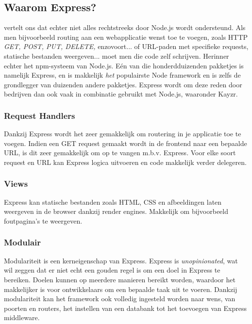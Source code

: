 \subsection{Waarom Express?}
\label{sec:whyExpress}

\textcite{ExpressMozilla} vertelt ons dat echter niet alles rechtstreeks door Node.js wordt ondersteund. Als men bijvoorbeeld routing aan een webapplicatie wenst toe te voegen, zoals HTTP \textsl{GET, POST, PUT, DELETE,} enzovoort... of URL-paden met specifieke requests, statische bestanden weergeven... moet men die code zelf schrijven. Herinner echter het npm-systeem van Node.js. Eén van die honderdduizenden pakketjes is namelijk Express, en is makkelijk \textit{het} populairste Node framework en is zelfs de grondlegger van duizenden andere pakketjes. Express wordt om deze reden door bedrijven dan ook vaak in combinatie gebruikt met Node.js, waaronder Kayzr. 

\subsubsection{Request Handlers}
\label{sec:reqHandlers}

Dankzij Express wordt het zeer gemakkelijk om routering in je applicatie toe te voegen. Indien een GET request gemaakt wordt in de frontend naar een bepaalde URL, is dit zeer gemakkelijk om op te vangen m.b.v. Express. Voor elke soort request en URL kan Express logica uitvoeren en code makkelijk verder delegeren.

\subsubsection{Views}
\label{sec:expressViews}

Express kan statische bestanden zoals HTML, CSS en afbeeldingen laten weergeven in de browser dankzij render engines. Makkelijk om bijvoorbeeld foutpagina's te weergeven.

\subsubsection{Modulair}
\label{sec:expressModularity}

Modulariteit is een kerneigenschap van Express. Express is \textit{unopinionated}, wat wil zeggen dat er niet echt een gouden regel is om een doel in Express te bereiken. Doelen kunnen op meerdere manieren bereikt worden, waardoor het makkelijker is voor ontwikkelaars om een bepaalde taak uit te voeren. Dankzij modulariteit kan het framework ook volledig ingesteld worden naar wens, van poorten en routers, het instellen van een databank tot het toevoegen van Express middleware. 

